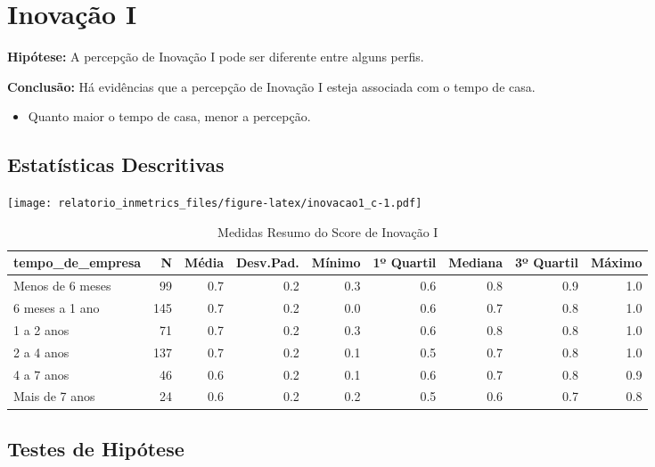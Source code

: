 \documentclass[]{book}
\providecommand{\tightlist}{%
  \setlength{\itemsep}{0pt}\setlength{\parskip}{0pt}}
\begin{document}
\pagebreak

\hypertarget{inovacao-i}{%
\section{Inovação I}\label{inovacao-i}}

\textbf{Hipótese:} A percepção de Inovação I pode ser diferente entre alguns perfis.

\textbf{Conclusão:} Há evidências que a percepção de Inovação I esteja associada com o tempo de casa.

\begin{itemize}
\tightlist
\item
  Quanto maior o tempo de casa, menor a percepção.
\end{itemize}

\hypertarget{estatisticas-descritivas-13}{%
\subsection{Estatísticas Descritivas}\label{estatisticas-descritivas-13}}

\texttt{[image: relatorio\_inmetrics\_files/figure-latex/inovacao1\_c-1.pdf]}

\begin{table}[t]

\caption{\label{tab:unnamed-chunk-34}Medidas Resumo do Score de Inovação I}
\centering
\fontsize{7}{9}\selectfont
\begin{tabular}{lrrrrrrrr}
\toprule
tempo\_de\_empresa & N & Média & Desv.Pad. & Mínimo & 1º Quartil & Mediana & 3º Quartil & Máximo\\
\midrule
Menos de 6 meses & 99 & 0.7 & 0.2 & 0.3 & 0.6 & 0.8 & 0.9 & 1.0\\
6 meses a 1 ano & 145 & 0.7 & 0.2 & 0.0 & 0.6 & 0.7 & 0.8 & 1.0\\
1 a 2 anos & 71 & 0.7 & 0.2 & 0.3 & 0.6 & 0.8 & 0.8 & 1.0\\
2 a 4 anos & 137 & 0.7 & 0.2 & 0.1 & 0.5 & 0.7 & 0.8 & 1.0\\
4 a 7 anos & 46 & 0.6 & 0.2 & 0.1 & 0.6 & 0.7 & 0.8 & 0.9\\
\addlinespace
Mais de 7 anos & 24 & 0.6 & 0.2 & 0.2 & 0.5 & 0.6 & 0.7 & 0.8\\
\bottomrule
\end{tabular}
\end{table}

\pagebreak

\hypertarget{testes-de-hipotese-13}{%
\subsection{Testes de Hipótese}\label{testes-de-hipotese-13}}
\end{document}

